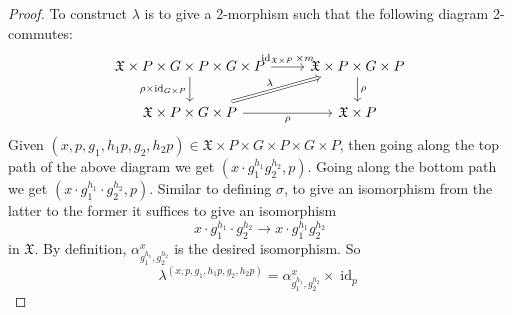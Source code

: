 \documentclass[12pt, final]{amsart}
\theoremstyle{remark}
\theoremstyle{definition}
\theoremstyle{plain}
\newcommand{\fX}{{\mathfrak X}}
\DeclareMathOperator{\id}{id}
\begin{document}
\begin{proof}
    To construct $\lambda$ is to give a 2-morphism such that the following 
    diagram 2-commutes:
    $$
    \begin{tikzcd}
        {\fX\times P\times G \times P \times G \times P} & {\fX\times P \times G \times P} \\
        {\fX\times P \times G \times P} & {\fX\times P}
        \arrow["{\id_{\fX\times P}\times m}", from=1-1, to=1-2]
        \arrow["{\rho\times\id_{G\times P}}"', from=1-1, to=2-1]
        \arrow["\rho", from=1-2, to=2-2]
        \arrow["\lambda", Rightarrow, from=2-1, to=1-2]
        \arrow["\rho"', from=2-1, to=2-2]
    \end{tikzcd}
    $$
    Given 
    $(x,p,g_{1},h_{1}p,g_{2},h_{2}p) \in \fX\times P\times G \times P \times G \times P$,
    then going along the top path of the above diagram we get
    $(x\cdot g_{1}^{h_{1}}g_{2}^{h_{2}},p)$. Going along the bottom 
    path we get $(x \cdot g_{1}^{h_{1}}\cdot g_{2}^{h_{2}}, p)$.
    Similar to defining $\sigma$, to give an isomorphism from the latter to the former
    it suffices to give an isomorphism
    $$x \cdot g_{1}^{h_{1}}\cdot g_{2}^{h_{2}} \to x\cdot g_{1}^{h_{1}}g_{2}^{h_{2}} $$
    in $\fX$. By definition, 
    $\alpha_{g_{1}^{h_{1}}, g_{2}^{h_{2}}}^{x}$
    is the desired isomorphism. So 
    $$\lambda^{(x,p,g_1,h_1p,g_2,h_2p)}= \alpha_{g_{1}^{h_{1}},g_{2}^{h_{2}}}^{x} \times \id_{p}$$


\end{proof}
\end{document}
